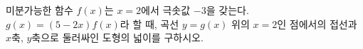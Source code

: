 미분가능한 함수 $f(x)$는 $x=2$에서 극솟값 $-3$을 갖는다. $g(x)=(5-2x)f(x)$라 할 때, 곡선 $y=g(x)$ 위의 $x=2$인 점에서의 접선과 $x$축, $y$축으로 둘러싸인 도형의 넓이를 구하시오.

